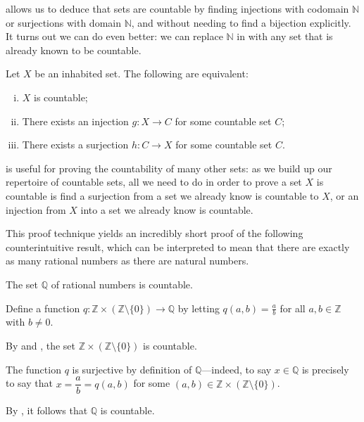  allows us to deduce that sets are countable by finding injections with codomain $\mathbb{N}$ or surjections with domain $\mathbb{N}$, and without needing to find a bijection explicitly. It turns out we can do even better: we can replace $\mathbb{N}$ in  with any set that is already known to be countable.

\begin{exercise}
\label{exCountabilityFromInjectionsAndSurjections}
Let $X$ be an inhabited set. The following are equivalent:
\begin{enumerate}[(i)]
\item \label{itmInjectionSurjectionCountableSets} $X$ is countable;
\item \label{itmInjectionIntoCountableSet} There exists an injection $g : X \to C$ for some countable set $C$;
\item \label{itmSurjectionFromCountableSet} There exists a surjection $h : C \to X$ for some countable set $C$.
\end{enumerate}
\end{exercise}

 is useful for proving the countability of many other sets: as we build up our repertoire of countable sets, all we need to do in order to prove a set $X$ is countable is find a surjection from a set we already know is countable to $X$, or an injection from $X$ into a set we already know is countable.

This proof technique yields an incredibly short proof of the following counterintuitive result, which can be interpreted to mean that there are exactly as many rational numbers as there are natural numbers.

\begin{theorem}
\label{thmRationalsAreCountable}
The set $\mathbb{Q}$ of rational numbers is countable.
\end{theorem}

\begin{cproof}
Define a function $q : \mathbb{Z} \times (\mathbb{Z} \setminus \{ 0 \}) \to \mathbb{Q}$ by letting $q(a,b) = \frac{a}{b}$ for all $a,b \in \mathbb{Z}$ with $b \ne 0$.

By  and , the set $\mathbb{Z} \times (\mathbb{Z} \setminus \{ 0 \})$ is countable.

The function $q$ is surjective by definition of $\mathbb{Q}$---indeed, to say $x \in \mathbb{Q}$ is precisely to say that $x = \dfrac{a}{b} = q(a,b)$ for some $(a,b) \in \mathbb{Z} \times (\mathbb{Z} \setminus \{ 0 \})$.

By , it follows that $\mathbb{Q}$ is countable.
\end{cproof}

